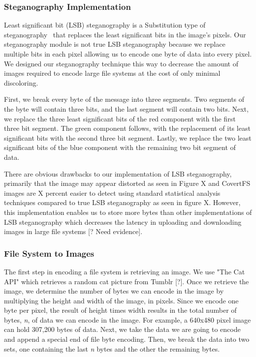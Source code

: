 \subsubsection{Steganography Implementation}

Least significant bit (LSB) steganography is a Substitution type of steganography~\cite{Nosrati2011} that replaces the least significant bits in the image's pixels. Our steganography module is not true LSB steganography because we replace multiple bits in each pixel allowing us to encode one byte of data into every pixel. We designed our steganography technique this way to decrease the amount of images required to encode large file systems at the cost of only minimal discoloring. 

First, we break every byte of the message into three segments. Two segments of the byte will contain three bits, and the last segment will contain two bits. Next, we replace the three least significant bits of the red component with the first three bit segment. The green component follows, with the replacement of its least significant bits with the second three bit segment. Lastly, we replace the two least significant bits of the blue component with the remaining two bit segment of data. 

There are obvious drawbacks to our implementation of LSB steganography, primarily that the image may appear distorted as seen in Figure X and CovertFS images are X percent easier to detect using standard statistical analysis techniques compared to true LSB steganography as seen in figure X. However, this implementation enables us to store more bytes than other implementations of LSB steganography which decreases the latency in uploading and downloading images in large file systems [? Need evidence].
 
\subsubsection{File System to Images}

The first step in encoding a file system is retrieving an image. We use "The Cat API" which retrieves a random cat picture from Tumblr [?]. Once we retrieve the image, we determine the number of bytes we can encode in the image by multiplying the height and width of the image, in pixels. Since we encode one byte per pixel, the result of height times width results in the total number of bytes, \textit{n}, of data we can encode in the image. For example, a 640x480 pixel image can hold 307,200 bytes of data. Next, we take the data we are going to encode and append a special end of file byte encoding. Then, we break the data into two sets, one containing the last \textit{n} bytes and the other the remaining bytes. 

